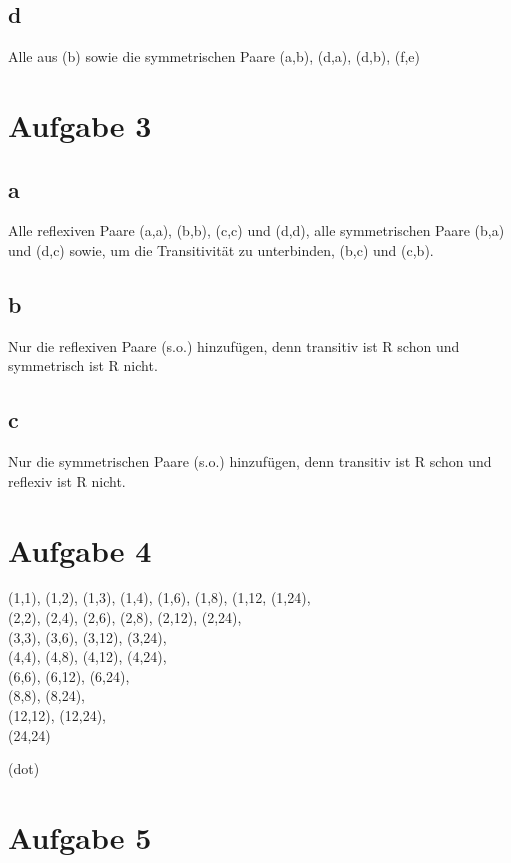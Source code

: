\documentclass[11pt, oneside]{scrartcl}   	%
\begin{document}
\subsection*{d}
Alle aus (b) sowie die symmetrischen Paare (a,b), (d,a), (d,b), (f,e)

\section*{Aufgabe 3}

\subsection*{a}
Alle reflexiven Paare (a,a), (b,b), (c,c) und (d,d), alle symmetrischen Paare (b,a) und (d,c) sowie, um die Transitivität zu unterbinden, (b,c) und (c,b).

\subsection*{b}
Nur die reflexiven Paare (s.o.) hinzufügen, denn transitiv ist R schon und symmetrisch ist R nicht.

\subsection*{c}
Nur die symmetrischen Paare (s.o.) hinzufügen, denn transitiv ist R schon und reflexiv ist R nicht.

\section*{Aufgabe 4}
(1,1), (1,2), (1,3), (1,4), (1,6), (1,8), (1,12, (1,24),\\
(2,2), (2,4), (2,6), (2,8), (2,12), (2,24),\\
(3,3), (3,6), (3,12), (3,24),\\
(4,4), (4,8), (4,12), (4,24),\\
(6,6), (6,12), (6,24),\\
(8,8), (8,24),\\
(12,12), (12,24),\\
(24,24)

(dot)

\section*{Aufgabe 5}
\end{document}
